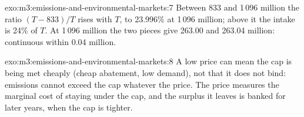 \begin{solution}{exo:m3:emissions-and-environmental-markets:7}
Between 833 and 1\,096 million the ratio $(T - 833)/T$ rises with $T$, to 23.996\% at 1\,096
million; above it the intake is 24\% of $T$. At 1\,096 million the two pieces give 263.00 and 263.04
million: continuous within 0.04 million.
\end{solution}

\begin{solution}{exo:m3:emissions-and-environmental-markets:8}
A low price can mean the cap is being met cheaply (cheap abatement, low demand), not that it does not
bind: emissions cannot exceed the cap whatever the price. The price measures the marginal cost of
staying under the cap, and the surplus it leaves is banked for later years, when the cap is tighter.
\end{solution}

